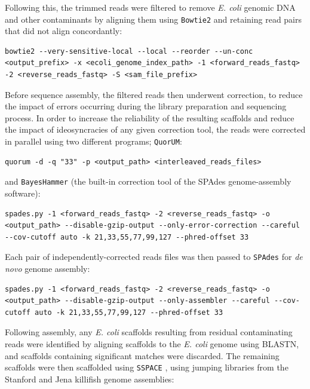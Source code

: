 Following this, the trimmed reads were filtered to remove \textit{E. coli} genomic DNA and other contaminants by aligning them using \lstinline{Bowtie2} \parencite{langmead2012bowtie2} and retaining read pairs that did not align concordantly:

\begin{lstlisting}
bowtie2 --very-sensitive-local --local --reorder --un-conc <output_prefix> -x <ecoli_genome_index_path> -1 <forward_reads_fastq> -2 <reverse_reads_fastq> -S <sam_file_prefix>
\end{lstlisting}


Before sequence assembly, the filtered reads then underwent correction, to reduce the impact of errors occurring during the library preparation and sequencing process. In order to increase the reliability of the resulting scaffolds and reduce the impact of ideosyncracies of any given correction tool, the reads were corrected in parallel using two different programs; \lstinline{QuorUM}:

\begin{lstlisting}
quorum -d -q "33" -p <output_path> <interleaved_reads_files>
\end{lstlisting}

\noindent and \lstinline{BayesHammer} (the built-in correction tool of the SPAdes genome-assembly software):

\begin{lstlisting}
spades.py -1 <forward_reads_fastq> -2 <reverse_reads_fastq> -o <output_path> --disable-gzip-output --only-error-correction --careful --cov-cutoff auto -k 21,33,55,77,99,127 --phred-offset 33
\end{lstlisting}

Each pair of independently-corrected reads files was then passed to \lstinline{SPAdes} for \textit{de novo} genome assembly:

\begin{lstlisting}
spades.py -1 <forward_reads_fastq> -2 <reverse_reads_fastq> -o <output_path> --disable-gzip-output --only-assembler --careful --cov-cutoff auto -k 21,33,55,77,99,127 --phred-offset 33
\end{lstlisting}

Following assembly, any \textit{E. coli} scaffolds resulting from residual contaminating reads were identified by aligning scaffolds to the \textit{E. coli} genome using BLASTN, and scaffolds containing significant matches were discarded. The remaining scaffolds were then scaffolded using \lstinline{SSPACE} \parencite{boetzer2011sspace}, using jumping libraries from the Stanford and Jena killifish genome assemblies:

